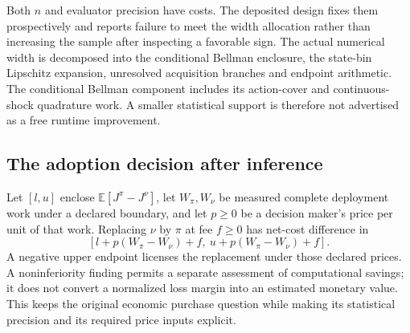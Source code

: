 Both $n$ and evaluator precision have costs. The deposited design fixes them prospectively and reports failure to meet the width allocation rather than increasing the sample after inspecting a favorable sign. The actual numerical width is decomposed into the conditional Bellman enclosure, the state-bin Lipschitz expansion, unresolved acquisition branches and endpoint arithmetic. The conditional Bellman component includes its action-cover and continuous-shock quadrature work. A smaller statistical support is therefore not advertised as a free runtime improvement.

\subsection{The adoption decision after inference}
Let $[l,u]$ enclose $\mathbb E[J^\pi-J^\nu]$, let $W_\pi,W_\nu$ be measured complete deployment work under a declared boundary, and let $p\ge0$ be a decision maker's price per unit of that work. Replacing $\nu$ by $\pi$ at fee $f\ge0$ has net-cost difference in
\[
 [l+p(W_\pi-W_\nu)+f,\ u+p(W_\pi-W_\nu)+f].
\]
A negative upper endpoint licenses the replacement under those declared prices. A noninferiority finding permits a separate assessment of computational savings; it does not convert a normalized loss margin into an estimated monetary value. This keeps the original economic purchase question while making its statistical precision and its required price inputs explicit.
